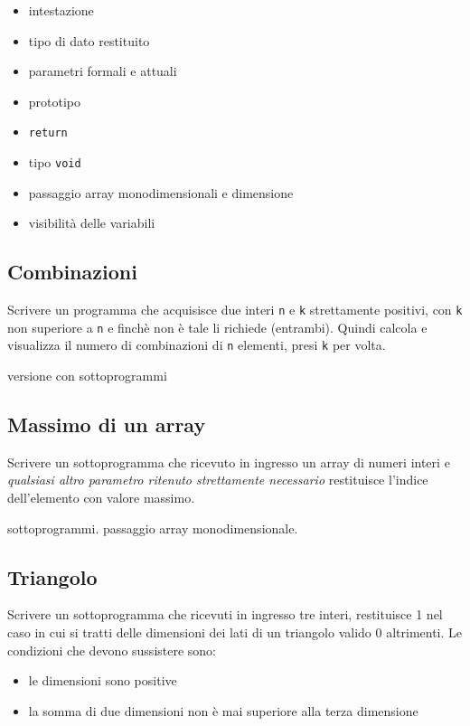 \begin{itemize}
\item intestazione
\item tipo di dato restituito
\item parametri formali e attuali
\item prototipo 
\item \texttt{return}
\item tipo \texttt{void}
\item passaggio array monodimensionali e dimensione
\item visibilit\`a delle variabili
\end{itemize}

\subsection{Combinazioni}
Scrivere un programma che acquisisce due interi \texttt{n} e \texttt{k} strettamente positivi, con \texttt{k} non superiore a  \texttt{n} e finch\`e non \`e tale li richiede (entrambi). Quindi calcola e visualizza il numero di combinazioni di \texttt{n} elementi, presi \texttt{k} per volta.


versione con sottoprogrammi



\subsection{Massimo di un array} 
Scrivere un sottoprogramma che ricevuto in ingresso un array di numeri interi e \textit{qualsiasi altro parametro ritenuto strettamente necessario} restituisce l'indice dell'elemento con valore massimo.

\begin{tags}
sottoprogrammi. passaggio array monodimensionale.
\end{tags}



\subsection{Triangolo} 
Scrivere un sottoprogramma che ricevuti in ingresso tre interi, restituisce 1 nel caso in cui si tratti delle dimensioni dei lati di un triangolo valido 0 altrimenti. Le condizioni che devono sussistere sono:\begin{itemize}
\item le dimensioni sono positive
\item la somma di due dimensioni non \`e mai superiore alla terza dimensione
\end{itemize}


